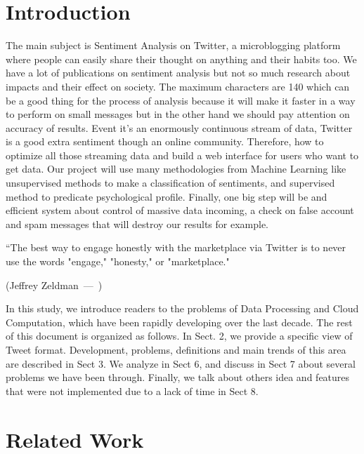 \documentclass{acmtog} %
\let\oldquote\quote
\let\endoldquote\endquote
\renewenvironment{quote}[2][]
  {\if\relax\detokenize{#1}\relax
     \def\quoteauthor{#2}%
   \else
     \def\quoteauthor{#2~---~#1}%
   \fi
   \oldquote}
  {\par\nobreak\smallskip\hfill(\quoteauthor)%
   \endoldquote\addvspace{\bigskipamount}}
\begin{document}
\section{Introduction}
The main subject is Sentiment Analysis on Twitter, a microblogging platform where people can easily share their thought on anything and their habits too. We have a lot of publications on sentiment analysis but not so much research about impacts and their effect on society. The maximum characters are 140 which can be a good thing for the process of analysis because it will make it faster in a way to perform on small messages but in the other hand we should pay attention on accuracy of results. Event it’s an enormously continuous stream of data, Twitter is a good extra sentiment though an online community. Therefore, how to optimize all those streaming data and build a web interface for users who want to get data. Our project will use many methodologies from Machine Learning like unsupervised methods to make a classification of sentiments, and supervised method to predicate psychological profile. Finally, one big step will be and efficient system about control of massive data incoming, a check on false account and spam messages that will destroy our results for example.
 
\begin{quote}{Jeffrey Zeldman}
“The best way to engage honestly with the marketplace via Twitter is to never use the words "engage," "honesty," or "marketplace." 
\end{quote}

In this study, we introduce readers to the problems of Data Processing and Cloud Computation, which have been rapidly developing over the last decade. The rest of this document is organized as follows. In Sect. 2, we provide a specific view of Tweet format. Development, problems, definitions and main trends of this area are described in Sect 3. We analyze in Sect 6, and discuss in Sect 7 about several problems we have been through.
Finally, we talk about others idea and features that were not implemented due to a lack of time in Sect 8.

\section{Related Work}
\label{sec:related_work}
\end{document}
